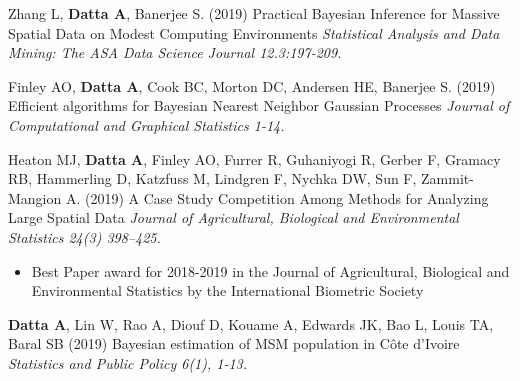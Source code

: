 \documentclass[12pt]{article}
\newcommand{\mine}{
  \addtocounter{enumi}{1}
\item[\fcolorbox{white}{grey}{\color{white} \tiny \arabic{enumi}}]
}
\begin{document}
\item Zhang L, \textbf{Datta A}, Banerjee S. (2019) {Practical Bayesian Inference for Massive Spatial Data on Modest Computing Environments}
{\it Statistical Analysis and Data Mining: The ASA Data Science Journal 12.3:197-209.}

\item Finley AO, \textbf{Datta A}, Cook BC, Morton DC, Andersen HE, Banerjee S. (2019)
{Efficient algorithms for Bayesian Nearest Neighbor Gaussian Processes}
{\it  Journal of Computational and Graphical Statistics 1-14.}

\item  Heaton MJ, \textbf{Datta A}, Finley AO, Furrer R, Guhaniyogi R, Gerber F, Gramacy RB, Hammerling D, Katzfuss M, Lindgren F, Nychka DW, Sun F, Zammit-Mangion A. (2019)
{A Case Study Competition Among Methods for Analyzing Large Spatial Data}
{\it Journal of Agricultural, Biological and Environmental Statistics 24(3) 398--425.}
\begin{itemize}
	\item Best Paper award for 2018-2019 in the Journal of Agricultural, Biological and Environmental Statistics by the International Biometric Society
\end{itemize}

\mine \textbf{Datta A}, Lin W, Rao A, Diouf D, Kouame A, Edwards JK, Bao L, Louis TA, Baral SB (2019)
{Bayesian estimation of MSM population in Côte d’Ivoire}
{\it  Statistics and Public Policy 6(1), 1-13.}
\end{document}

